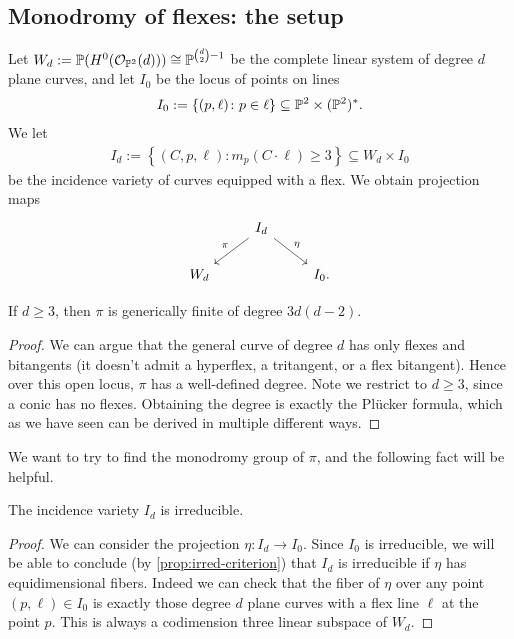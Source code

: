 \documentclass[11pt]{amsart}
\begin{document}
\subsection{Monodromy of flexes: the setup}

Let $W_d := \mathbb{P}(H^0(\O_{\P^2}(d))) \cong \P^{\binom{d}{2}-1}$ be the complete linear system of degree $d$ plane curves, and let $I_0$ be the locus of points on lines
\begin{align*}
    I_0 := \left\{ (p,\ell) \colon p\in \ell \right\} \subseteq \P^2 \times (\P^2)^\ast.
\end{align*}
We let
\begin{align*}
    I_d := \left\{ (C,p,\ell) : m_p(C\cdot \ell)\ge 3 \right\} \subseteq W_d \times I_0
\end{align*}
be the incidence variety of curves equipped with a flex. We obtain projection maps
\[ \begin{tikzcd}
     & I_d\ar[dl,"\pi" above left]\ar[dr,"\eta" above right] & \\
    W_d &  & I_0.
\end{tikzcd} \]
%
\begin{proposition} If $d \ge 3$, then $\pi$ is generically finite of degree $3d(d-2)$.
\end{proposition}
\begin{proof} We can argue that the general curve of degree $d$ has only flexes and bitangents (it doesn't admit a hyperflex, a tritangent, or a flex bitangent). Hence over this open locus, $\pi$ has a well-defined degree. Note we restrict to $d\ge 3$, since a conic has no flexes. Obtaining the degree is exactly the Pl\"{u}cker formula, which as we have seen can be derived in multiple different ways.
\end{proof}


We want to try to find the monodromy group of $\pi$, and the following fact will be helpful.

\begin{proposition}\label{prop:Id-irred-flexes}
The incidence variety $I_d$ is irreducible.
\end{proposition}
\begin{proof} We can consider the projection $\eta \colon I_d \to I_0$. Since $I_0$ is irreducible, we will be able to conclude (by \autoref{prop:irred-criterion}) that $I_d$ is irreducible if $\eta$ has equidimensional fibers. Indeed we can check that the fiber of $\eta$ over any point $(p,\ell) \in I_0$ is exactly those degree $d$ plane curves with a flex line $\ell$ at the point $p$. This is always a codimension three linear subspace of $W_d$.
\end{proof}
\end{document}
